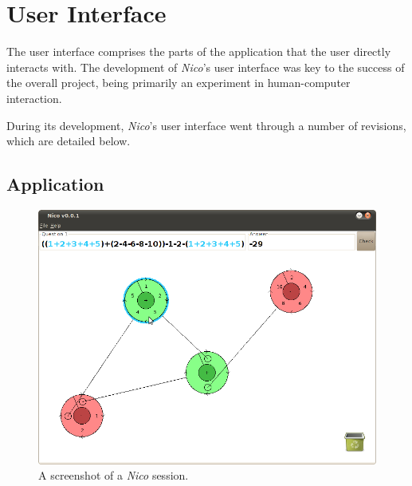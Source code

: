 \documentclass[12pt,twoside,notitlepage,xetex]{report}
\begin{document}
{\section{User Interface}%

The user interface comprises the parts of the application that the user directly interacts with.  The development of \emph{Nico}'s user interface was key to the success of the overall project, being primarily an experiment in human-computer interaction.

During its development, \emph{Nico}'s user interface went through a number of revisions, which are detailed below.

\subsection{Application}

\begin{center}
\begin{figure}[H]
\begin{center}
\includegraphics[width=\textwidth]{figs/nico_screen_01.png}
\end{center}
\caption{A screenshot of a \emph{Nico} session.}
\label{fig:Nico1}
\end{figure}
\end{center}

}
\end{document}
